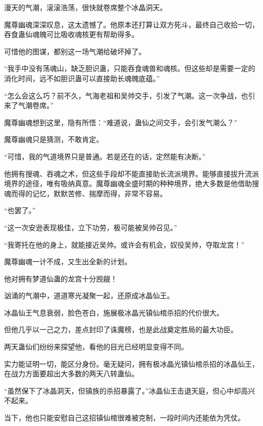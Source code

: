 
\begin{this_body}



漫天的气潮，滚滚浩荡，很快就卷席整个冰晶洞天。

魔尊幽魂深深叹息，这太遗憾了。他原本还打算让双方死斗，最终自己收拾一切，吞食蛊仙魂魄可比吸收魂核更有帮助得多。

可惜他的图谋，都别这一场气潮给破坏掉了。

“我手中没有荡魂山，缺乏胆识蛊，只能吞食魂兽和魂核。但这些却是需要一定的消化时间，远不如胆识蛊可以直接助长魂魄底蕴。”

“怎么会这么巧？前不久，气海老祖和吴帅交手，引发了气潮。这一次争战，也引来了气潮卷席。”

魔尊幽魂想到这里，隐有所悟：“难道说，蛊仙之间交手，会引发气潮么？”

魔尊幽魂只是猜测，不敢肯定。

“可惜，我的气道境界只是普通。若是还在的话，定然能有决断。”

他拥有搜魂、吞魂之术，但这些手段却不能直接助长流派境界。能够直接拔升流派境界的途径，唯有吸纳真意。魔尊幽魂全盛时期的种种境界，绝大多数是他借助搜魂而得的记忆，默默苦修、揣摩而得，非常不容易。

“也罢了。”

“这一次安逊表现极佳，立下功劳，极可能被吴帅召见。”

“我寄托在他的身上，就能接近吴帅。或许会有机会，奴役吴帅，夺取龙宫！”

魔尊幽魂一计不成，又生出全新的计划。

他对拥有梦道仙蛊的龙宫十分觊觎！

汹涌的气潮中，道道寒光凝聚一起，还原成冰晶仙王。

冰晶仙王气息衰弱，脸色苍白，施展极冰晶光镇仙棺杀招的代价很大。

但他几乎以一己之力，差点封印了诛魔榜，也是此战奠定胜局的最大功臣。

两天蛊仙们纷纷来探望他，看他的目光已经明显变得不同。

实力能证明一切，能区分身份。毫无疑问，拥有极冰晶光镇仙棺杀招的冰晶仙王，在战力方面要超出大多数的两天八转蛊仙。

“虽然保下了冰晶洞天，但镇族的杀招暴露了。”冰晶仙王击退天庭，但心中却高兴不起来。

当下，他也只能安慰自己这招镇仙棺很难被克制，一段时间内还能依为凭仗。


\end{this_body}

